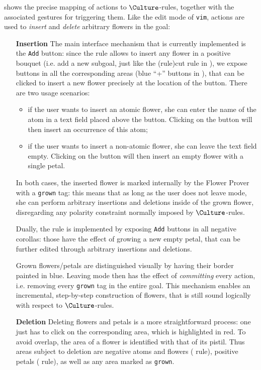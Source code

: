  shows the precise mapping of \Edit actions to
$\Culture$-rules, together with the associated gestures for triggering them.
Like the edit mode of \texttt{vim}, \Edit actions are used to \emph{insert} and
\emph{delete} arbitrary flowers in the goal:
\begin{itemize}
  \item[\textbf{Insertion}] The main interface mechanism that is currently
  implemented is the \texttt{Add} button: since the  rule allows to
  insert any flower in a positive bouquet (i.e. add a new subgoal, just like the
  \kl(rule){cut} rule in ), we expose buttons in all the corresponding
  areas (blue ``+'' buttons in ), that can be
  clicked to insert a new flower precisely at the location of the button. There
  are two usage scenarios:
  \begin{itemize}
    \item if the user wants to insert an atomic flower, she can enter the name
    of the atom in a text field placed above the button. Clicking on the button
    will then insert an occurrence of this atom;
    \item if the user wants to insert a non-atomic flower, she can leave the
    text field empty. Clicking on the button will then insert an empty flower
    with a single petal.
  \end{itemize}
  In both cases, the inserted flower is marked internally by the Flower Prover
  with a \texttt{grown} tag: this means that as long as the user does not leave
  \Edit mode, she can perform arbitrary insertions and deletions inside of the
  grown flower, disregarding any polarity constraint normally imposed by
  $\Culture$-rules.
  
  Dually, the  rule is implemented by exposing \texttt{Add} buttons in
  all negative corollas: those have the effect of growing a new empty petal,
  that can be further edited through arbitrary insertions and deletions.

  Grown flowers/petals are distinguished visually by having their border painted
  in blue. Leaving \Edit mode then has the effect of \emph{committing} every
  \Edit action, i.e. removing every \texttt{grown} tag in the entire goal. This
  mechanism enables an incremental, step-by-step construction of flowers, that
  is still sound logically with respect to $\Culture$-rules.

  \item[\textbf{Deletion}] Deleting flowers and petals is a more straightforward
  process: one just has to click on the corresponding area, which is highlighted
  in red. To avoid overlap, the area of a flower is identified with that of its
  pistil. Thus areas subject to deletion are negative atoms and flowers
  ( rule), positive petals ( rule), as well as any area
  marked as \texttt{grown}.
\end{itemize}

